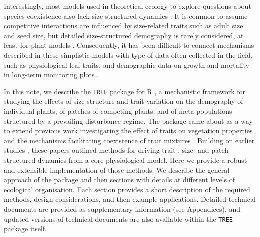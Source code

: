 \documentclass[a4paper,11pt]{article}
\begin{document}
Interestingly, most models used in theoretical ecology to explore
questions about species coexistence also lack size-structured dynamics
\citep[e.g.][]{Calcagno-2006, Geritz-1995, Leimar-2013, Levin-1974,MacArthur-1967,Tilman-1985}.
It is common to assume competitive interactions are influenced by
size-related traits such as adult size and seed size, but detailed
size-structured demography is rarely considered, at least for plant
models \cite[for animal examples, see][]{Deroos-1988, Deroos-1992}. Consequently, it has
been difficult to connect mechanisms described in these simplistic
models with type of data often collected in the field, such as physiological
leaf traits, and demographic data on growth and mortality in long-term monitoring 
plots \citep{Adler-2013}.

In this note, we describe the \texttt{TREE} package for R
\citep{R-2015}, a mechanistic framework for studying the effects of size
structure and trait variation on the demography of individual plants, of
patches of competing plants, and of meta-populations structured by a
prevailing disturbance regime. The package came about as a way to extend
previous work investigating the effect of traits on vegetation
properties and the mechanisms facilitating
coexistence of trait mixtures \citep{Falster-2011,Falster-2015}. Building 
on earlier studies \citep{Deroos-1997,Kohyama-1993,Moorcroft-2001}, these
papers outlined methods for driving trait-, size- and patch-structured 
dynamics from a core physiological model. Here we provide 
a robust and extensible implementation of those methods. 
We describe the general approach of the
package and then sections with details at different levels of
ecological organisation. Each section provides a short description of
the required methods, design considerations, and then 
example applications. Detailed
technical documents are provided as supplementary information (see Appendices),
and updated versions of technical documents are also available within the \texttt{TREE}
package itself. 
\end{document}
